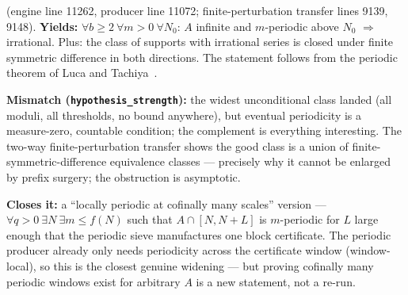 \begin{obs} 
 (engine
line 11262, producer line 11072; finite-perturbation transfer lines 9139, 9148).
\textbf{Yields:} $\forall b\ge2\ \forall m{>}0\ \forall N_0$: $A$ infinite and $m$-periodic above
$N_0$ $\Rightarrow$ irrational. Plus: the class of supports with irrational series is closed
under finite symmetric difference in both directions. The statement follows from the periodic
theorem of Luca and Tachiya~\cite[Theorem~A, p.~139]{lucatachiya2017}.

\par\medskip

\textbf{Mismatch (\texttt{hypothesis\_strength}):} the widest unconditional class landed (all
moduli, all thresholds, no bound anywhere), but eventual periodicity is a measure-zero, countable
condition; the complement is everything interesting. The two-way finite-perturbation transfer
shows the good class is a union of finite-symmetric-difference equivalence classes — precisely
why it cannot be enlarged by prefix surgery; the obstruction is asymptotic.

\par\medskip

\textbf{Closes it:} a ``locally periodic at cofinally many scales'' version — $\forall q{>}0\
\exists N\ \exists m\le f(N)$ such that $A\cap[N,N{+}L]$ is $m$-periodic for $L$ large enough
that the periodic sieve manufactures one block certificate. The periodic producer already only
needs periodicity across the certificate window (window-local), so this is the closest genuine
widening — but proving cofinally many periodic windows exist for arbitrary $A$ is a new
statement, not a re-run.
\end{obs}

